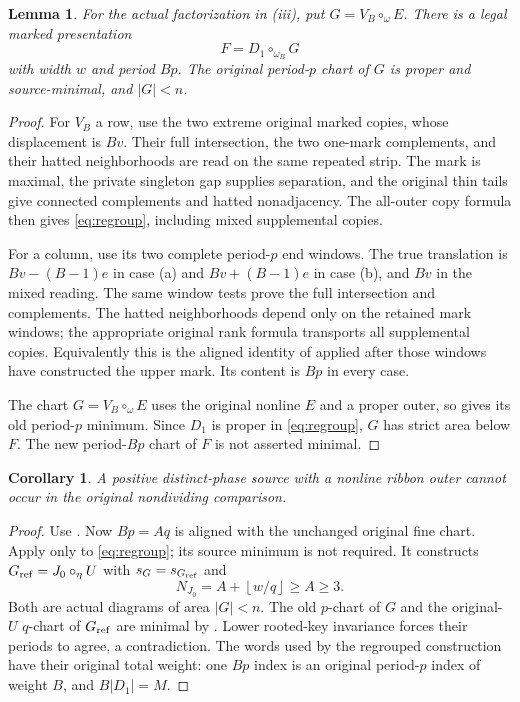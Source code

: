 \documentclass[11pt,a4paper]{amsart}
\numberwithin{equation}{section}
\theoremstyle{plain}
\newtheorem{lemma}[theorem]{Lemma}
\newtheorem{corollary}[theorem]{Corollary}
\theoremstyle{definition}
\newcommand{\floor}[1]{\left\lfloor#1\right\rfloor}
\begin{document}
\begin{lemma}\label{lem:regroup}
For the actual factorization in (iii), put
\(G=V_B\circ_\omega E\).  There is a legal marked presentation
\begin{equation}\label{eq:regroup}
 F=D_1\circ_{\omega_B}G
\end{equation}
with width \(w\) and period \(Bp\).  The original period-\(p\) chart of \(G\) is
proper and source-minimal, and \(|G|<n\).
\end{lemma}
\begin{proof}
For \(V_B\) a row, use the two extreme original marked copies, whose
displacement is \(Bv\).  Their full intersection, the two one-mark
complements, and their hatted neighborhoods are read on the same repeated
strip.  The mark is maximal, the private singleton gap supplies separation,
and the original thin tails give connected complements and hatted
nonadjacency.  The all-outer copy formula then gives \eqref{eq:regroup},
including mixed supplemental copies.

For a column, use its two complete period-\(p\) end windows.  The true
translation is \(Bv-(B-1)e\) in case (a) and \(Bv+(B-1)e\) in case (b),
and \(Bv\) in the mixed reading.  The same window tests prove the full
intersection and complements.  The hatted neighborhoods depend only on the
retained mark windows; the appropriate original rank formula transports
all supplemental copies.  Equivalently this is the aligned identity of
 applied after those windows have constructed the
upper mark.  Its content is \(Bp\) in every case.

The chart \(G=V_B\circ_\omega E\) uses the original nonline \(E\) and a proper
outer, so  gives its old period-\(p\) minimum.  Since \(D_1\) is
proper in \eqref{eq:regroup}, \(G\) has strict area below \(F\).  The new
period-\(Bp\) chart of \(F\) is not asserted minimal.
\end{proof}

\begin{corollary}\label{cor:nonline-outer-exit}
A positive distinct-phase source with a nonline ribbon outer cannot occur
in the original nondividing comparison.
\end{corollary}
\begin{proof}
Use .  Now \(Bp=Aq\) is aligned with the unchanged original
fine chart.  Apply only  to
\eqref{eq:regroup}; its source minimum is not required.  It constructs
\(G_{\rm ref}=J_0\circ_\eta U\) with \(s_G=s_{G_{\rm ref}}\) and
\[
 N_{J_0}=A+\floor{w/q}\ge A\ge3.
\]
Both are actual diagrams of area \(|G|<n\).  The old \(p\)-chart of \(G\) and
the original-\(U\) \(q\)-chart of \(G_{\rm ref}\) are minimal by
.  Lower rooted-key invariance forces their periods to agree,
a contradiction.  The words used by the regrouped construction have their
original total weight: one \(Bp\) index is an original period-\(p\) index of
weight \(B\), and \(B|D_1|=M\).
\end{proof}
\end{document}
